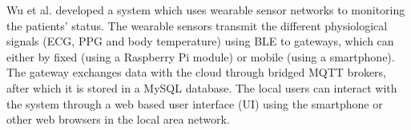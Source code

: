 %
%

Wu et al. \cite{Wu2020} developed a system which uses wearable sensor networks to monitoring the patients' status. The wearable sensors transmit the different physiological signals (ECG, PPG and body temperature) using \acs{BLE} to gateways, which can either by fixed (using a Raspberry Pi module) or mobile (using a smartphone). The gateway exchanges data with the cloud through bridged \acs{MQTT} brokers, after which it is stored in a MySQL database. The local users can interact with the system through a web based user interface (UI) using the smartphone or other web browsers in the local area network. 

